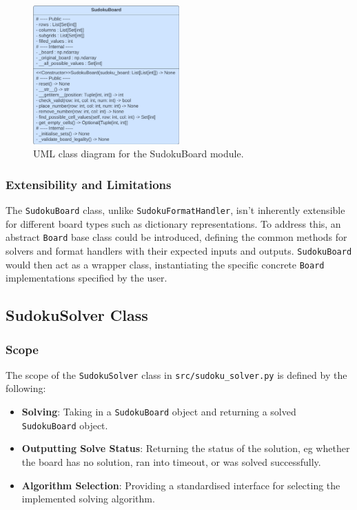 \documentclass[11pt]{article}
\begin{document}
\begin{figure}[H]
    \centering
    \includegraphics[width=0.5\textwidth]{figs/UML_sudoku_board.png}
    \caption{UML class diagram for the SudokuBoard module.}
    \label{fig:sudoku_board_uml}
\end{figure}
 
\subsubsection{Extensibility and Limitations}
The \texttt{SudokuBoard} class, unlike \texttt{SudokuFormatHandler}, isn't inherently extensible for different board types such as dictionary representations. To address this, an abstract \texttt{Board} base class could be introduced, defining the common methods for solvers and format handlers with their expected inputs and outputs. \texttt{SudokuBoard} would then act as a wrapper class, instantiating the specific concrete \texttt{Board} implementations specified by the user.


\subsection{SudokuSolver Class}
\subsubsection{Scope}
The scope of the \texttt{SudokuSolver} class in \texttt{src/sudoku\_solver.py} is defined by the following:
\begin{itemize}
    \item \textbf{Solving}: Taking in a \texttt{SudokuBoard} object and returning a solved \texttt{SudokuBoard} object.
    \item \textbf{Outputting Solve Status}: Returning the status of the solution, eg whether the board has no solution, ran into timeout, or was solved successfully.
    \item \textbf{Algorithm Selection}: Providing a standardised interface for selecting the implemented solving algorithm.
\end{itemize}
\end{document}

